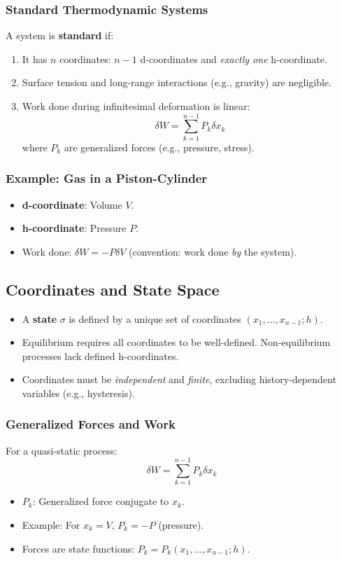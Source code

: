 \documentclass{article}
\theoremstyle{definition}
\begin{document}
\subsubsection{Standard Thermodynamic Systems}
A system is \textbf{standard} if:
\begin{enumerate}
    \item It has \( n \) coordinates: \( n-1 \) d-coordinates and \textit{exactly one} h-coordinate.
    \item Surface tension and long-range interactions (e.g., gravity) are negligible.
    \item Work done during infinitesimal deformation is linear: 
    \[
    \delta W = \sum_{k=1}^{n-1} P_k \delta x_k
    \]
    where \( P_k \) are generalized forces (e.g., pressure, stress).
\end{enumerate}

\subsubsection{Example: Gas in a Piston-Cylinder}
\begin{itemize}
    \item \textbf{d-coordinate}: Volume \( V \).
    \item \textbf{h-coordinate}: Pressure \( P \).
    \item Work done: \( \delta W = -P \delta V \) (convention: work done \textit{by} the system).
\end{itemize}

\subsection{Coordinates and State Space}
\begin{itemize}
    \item A \textbf{state} \( \sigma \) is defined by a unique set of coordinates \( (x_1, \ldots, x_{n-1}; h) \).
    \item Equilibrium requires all coordinates to be well-defined. Non-equilibrium processes lack defined h-coordinates.
    \item Coordinates must be \textit{independent} and \textit{finite}, excluding history-dependent variables (e.g., hysteresis).
\end{itemize}

\subsubsection{Generalized Forces and Work}
For a quasi-static process:
\[
\delta W = \sum_{k=1}^{n-1} P_k \delta x_k
\]
\begin{itemize}
    \item \( P_k \): Generalized force conjugate to \( x_k \).
    \item Example: For \( x_k = V \), \( P_k = -P \) (pressure).
    \item Forces are state functions: \( P_k = P_k(x_1, \ldots, x_{n-1}; h) \).
\end{itemize}
\end{document}
